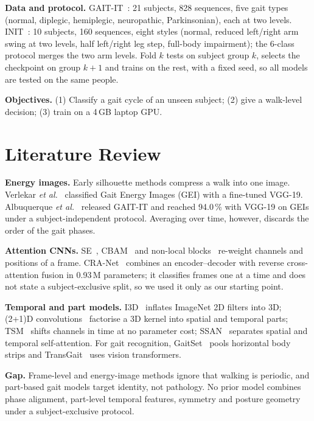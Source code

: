 \documentclass[conference]{IEEEtran}
\begin{document}
\textbf{Data and protocol.} GAIT-IT~\cite{albuquerque2021}: 21 subjects, 828
sequences, five gait types (normal, diplegic, hemiplegic, neuropathic,
Parkinsonian), each at two levels. INIT~\cite{ortells2018}: 10 subjects, 160
sequences, eight styles (normal, reduced left/right arm swing at two levels,
half left/right leg step, full-body impairment); the 6-class protocol merges
the two arm levels. Fold $k$ tests on subject group $k$, selects the checkpoint
on group $k{+}1$ and trains on the rest, with a fixed seed, so all models are
tested on the same people.

\textbf{Objectives.} (1) Classify a gait cycle of an unseen subject; (2) give a
walk-level decision; (3) train on a 4\,GB laptop GPU.

\section{Literature Review}
\textbf{Energy images.} Early silhouette methods compress a walk into one image.
Verlekar \emph{et al.}~\cite{verlekar2018} classified Gait Energy Images (GEI)
with a fine-tuned VGG-19. Albuquerque \emph{et al.}~\cite{albuquerque2021}
released GAIT-IT and reached 94.0\,\% with VGG-19 on GEIs under a
subject-independent protocol. Averaging over time, however, discards the order
of the gait phases.

\textbf{Attention CNNs.} SE~\cite{hu2018se}, CBAM~\cite{woo2018cbam} and
non-local blocks~\cite{wang2018nonlocal} re-weight channels and positions of a
frame. CRA-Net~\cite{bodepu_cranet} combines an encoder--decoder with reverse
cross-attention fusion in 0.93\,M parameters; it classifies frames one at a
time and does not state a subject-exclusive split, so we used it only as our
starting point.

\textbf{Temporal and part models.} I3D~\cite{carreira2017i3d} inflates
ImageNet 2D filters into 3D; (2+1)D convolutions~\cite{tran2018r21d} factorise a
3D kernel into spatial and temporal parts; TSM~\cite{lin2019tsm} shifts channels
in time at no parameter cost; SSAN~\cite{guo2021ssan} separates spatial and
temporal self-attention. For gait recognition, GaitSet~\cite{chao2019gaitset}
pools horizontal body strips and TransGait~\cite{li2023transgait} uses vision
transformers.

\textbf{Gap.} Frame-level and energy-image methods ignore that walking is
periodic, and part-based gait models target identity, not pathology. No prior
model combines phase alignment, part-level temporal features, symmetry and
posture geometry under a subject-exclusive protocol.
\end{document}
